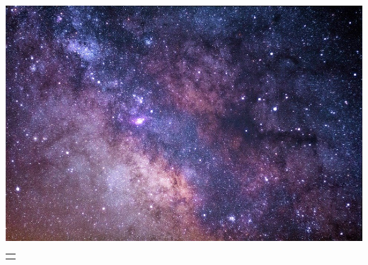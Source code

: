 \begin{titlepage}
    \begin{center}
    \centerline{\includegraphics[totalheight=0.5\paperwidth,width=1\paperwidth]{figures/formality/frontpageImage.jpg}}
    \end{center}

    \vspace*{-0.96cm}
    {
        \noindent
        \color{\fontcolor}
        \colorbox{\backgroundcolor}
        {
            \begin{tabular}{@{}p{0.9889999\paperwidth}@{}}
            
            \centerline
            {
                \begin{minipage}{0.85\textwidth}
                    \bigskip
    		        \bigskip
                    \centering
                    \Huge{\textbf{\maintitle}}
                \end{minipage}
            }
		
	        \centerline
	        {
    	        \begin{minipage}{0.9\textwidth}
                    \bigskip
                    \centering
                    \Large{\subtitle}
                \end{minipage}
            }
			
        	\centerline
        	{
            	\begin{minipage}{0.9\textwidth}
                    \bigskip
                    \centering
                    {\Large \authors[]}
                \end{minipage}
            }
			

\end{tabular}}}
\end{titlepage}
